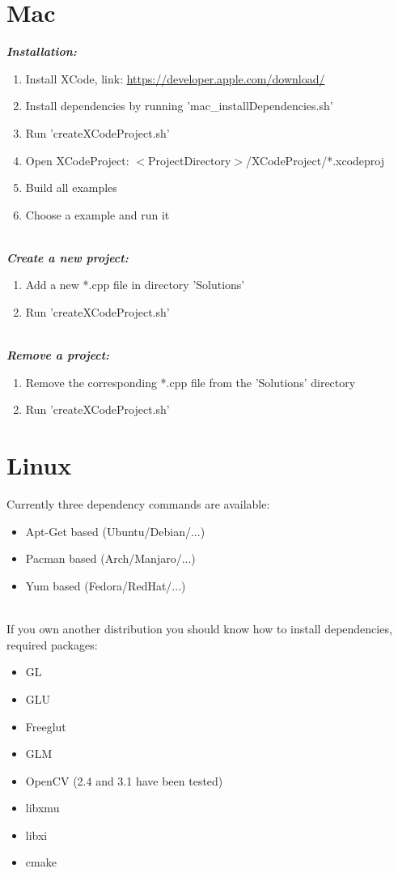 \documentclass[]{article}
\begin{document}
\newpage
\section{Mac}\label{Mac}

\textit{\textbf{Installation:}}
\begin{enumerate}
	\item Install XCode, link: \url{https://developer.apple.com/download/}
	\item Install dependencies by running 'mac\_installDependencies.sh'
	\item Run 'createXCodeProject.sh'
	\item Open XCodeProject: $<$ProjectDirectory$>$/XCodeProject/*.xcodeproj
	\item Build all examples
	\item Choose a example and run it 
\end{enumerate}

\mbox{} \\
\textit{\textbf{Create a new project:}}
\begin{enumerate}
\item Add a new *.cpp file in directory 'Solutions'
\item Run 'createXCodeProject.sh' 
\end{enumerate}

\mbox{} \\
\textit{\textbf{Remove a project:}}
\begin{enumerate}
\item Remove the corresponding *.cpp file from the 'Solutions' directory
\item Run 'createXCodeProject.sh' 
\end{enumerate}

\newpage
\section{Linux}\label{Linux}
Currently three dependency commands are available:
\begin{itemize}
	\item Apt-Get based (Ubuntu/Debian/...) 
	\item Pacman based (Arch/Manjaro/...)
	\item Yum based (Fedora/RedHat/...) 
\end{itemize}

\mbox{} \\
If you own another distribution you should know how to install dependencies, required packages:
\begin{itemize}
	\item GL
	\item GLU
	\item Freeglut
	\item GLM
	\item OpenCV (2.4 and 3.1 have been tested)
	\item libxmu 
	\item libxi
	\item cmake 
\end{itemize}
\end{document}

